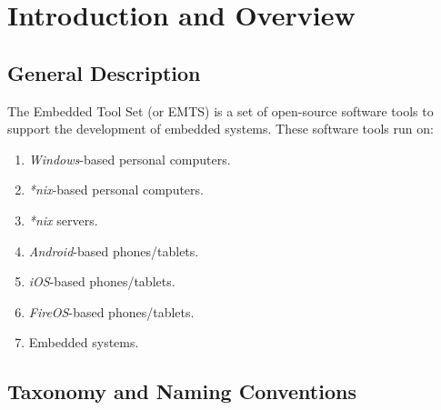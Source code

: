 \chapter{Introduction and Overview}

\label{ciov0}

\section{General Description}
\label{ciov2:siov0}

The Embedded Tool Set (or EMTS) is a set of open-source software tools
to support the development of embedded systems.  These software tools run
on:

\begin{enumerate}
   \item \emph{Windows}-based personal computers.
   \item \emph{*nix}-based personal computers.
   \item \emph{*nix} servers.
   \item \emph{Android}-based phones/tablets.
   \item \emph{iOS}-based phones/tablets.
   \item \emph{FireOS}-based phones/tablets.
   \item Embedded systems.
\end{enumerate}


\section{Taxonomy and Naming Conventions}
\label{ciov2:stnc0}

